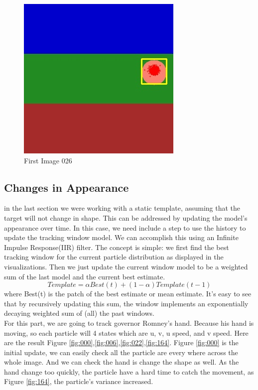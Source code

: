\documentclass[10pt, conference, compsocconf]{IEEEtran}
\begin{document}
\begin{figure}[H]
	\centering
	\includegraphics[scale = 0.30]{image/P1_0026.jpg}
	\caption{First Image 026}
	\label{fig:P1_026}
\end{figure}

\subsection{Changes in Appearance}
in the last section we were working with a static template, assuming that the target will not change in shape. This can be addressed by updating the model's appearance over time. In this case, we need include a step to use the history to update the tracking window model. We can accomplish this using an Infinite Impulse Response(IIR) filter. The concept
is simple: we first find the best tracking window for the current particle distribution as displayed in the
visualizations. Then we just update the current window model to be a weighted sum of the last model
and the current best estimate. 
\[Template = \alpha Best(t) + (1-\alpha)Template(t-1)\]
where Best(t) is the patch of the best estimate or mean estimate. It's easy to see that by recursively
updating this sum, the window implements an exponentially decaying weighted sum of (all) the past
windows.\\
For this part, we are going to track governor Romney's hand. Because his hand is moving, so each particle will 4 states which are u, v, u speed, and v speed. Here are the result Figure \ref{fig:000},\ref{fig:006},\ref{fig:022},\ref{fig:164}. Figure \ref{fig:000} is the initial update, we can easily check all the particle are every where across the whole image. And we can check the hand is change the shape as well. As the hand change too quickly, the particle have a hard time to catch the movement, as Figure \ref{fig:164}, the particle's variance increased. 
\end{document}
